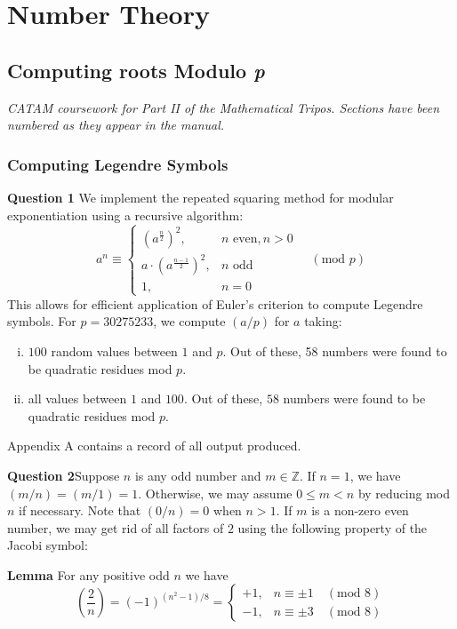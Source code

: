 \documentclass[12pt]{article}
\newcommand{\mathmod}[1]{\quad(\text{mod }#1)}
\begin{document}
\setcounter{section}{14}
\section{Number Theory}
\setcounter{subsection}{5}
\subsection{Computing roots Modulo \textit{p}}
\emph{CATAM coursework for Part II of the Mathematical Tripos. Sections have
been numbered as they appear in the manual.}

\setcounter{subsubsection}{1}
\subsubsection{Computing Legendre Symbols}
\textbf{Question 1} \quad 
We implement the repeated squaring method for modular exponentiation using a
recursive algorithm: 
\[a^n \equiv \begin{cases}
    (a^{\frac{n}{2}})^2, &n\text{ even}, n>0\\
    a\cdot (a^{\frac{n-1}{2}})^2, &n\text{ odd}\\
    1, &n = 0
\end{cases} \quad (\text{mod } p)\]
This allows for efficient application of Euler's criterion to compute Legendre
symbols. For \(p=30275233\), we compute \((a/p)\) for \(a\) taking:
\begin{enumerate}[(i)]
    \item \(100\) random values between \(1\) and \(p\). Out of these, 58
        numbers were found to be quadratic residues mod \(p\).
    \item all values between \(1\) and \(100\). Out of these, \(58\) numbers
        were found to be quadratic residues mod \(p\).
\end{enumerate}
Appendix A contains a record of all output produced.

 \hfill

\textbf{Question 2}\quad Suppose \(n\) is any odd number and \(m\in
\mathbb{Z}\).  If \(n=1\), we have \((m/n)=(m/1)=1\). Otherwise, we may assume
\(0\leq m < n\) by reducing mod \(n\) if necessary. Note that \((0/n)=0\) when
\(n>1\). If \(m\) is a non-zero even number, we may get rid of
all factors of \(2\) using the following property of the Jacobi symbol:

\textbf{Lemma} For any positive odd \(n\) we have
\[\left(\frac{2}{n}\right) = (-1)^{(n^2-1)/8}= \begin{cases} +1, &n \equiv \pm1
    \mathmod{8} \\ 
-1, &n\equiv \pm 3 \mathmod{8}\end{cases}\]
\end{document}
